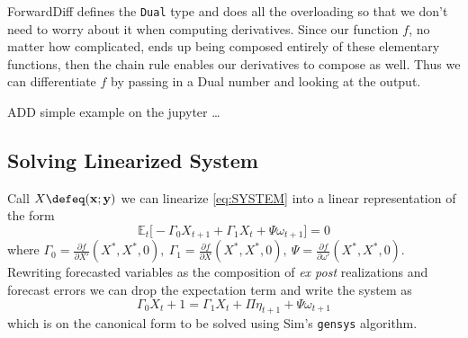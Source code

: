 \documentclass[a4paper,11pt]{article}  %
\begin{document}
ForwardDiff defines the \texttt{Dual} type and does all the overloading so that we don't need to
worry about it when computing derivatives.
Since our function $ f$, no matter how complicated, ends up being composed entirely of these elementary functions, then
the chain rule enables our derivatives to compose as well. Thus we can differentiate $f$
by passing in a Dual number and looking at the output.

ADD simple example on the jupyter \ldots

\subsection{Solving Linearized System} %
\label{sub:solving_linearized_system}

Call $X\defeq (\mathbf{x}; \mathbf{y})$ we can linearize \eqref{eq:SYSTEM} into a linear
representation of the form
\begin{equation*}
   \mathbb{E}_t \Big[ -\Gamma_0 X_{t+1} + \Gamma_1 X_t + \Psi \omega_{t+1} \Big] = 0
\end{equation*}
where
$ \Gamma_0 = \frac{\partial f }{\partial X'} ( X^*, X^*,0 ), \
\Gamma_1 = \frac{\partial f }{\partial X} ( X^*, X^*,0 ), \
\Psi = \frac{\partial f }{\partial \omega'} ( X^*, X^*,0 )$.
Rewriting forecasted variables as the composition of \emph{ex post} realizations and
forecast errors we can drop the expectation term and write the system as
\begin{equation}
   \label{eq:gensys}
   \Gamma_0 X_t+1 = \Gamma_1 X_{t} + \Pi \eta_{t+1} + \Psi \omega_{t+1}
\end{equation}
which is on the canonical form to be solved using Sim's \texttt{gensys} algorithm.




\clearpage
\newpage
% 
% 


\end{document}
